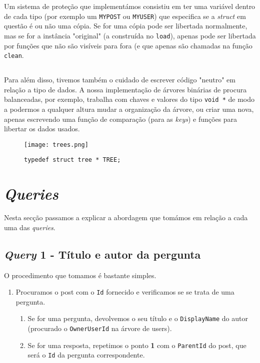 \documentclass[10pt]{article}
\begin{document}
		Um sistema de proteção que implementámos consistiu em ter uma variável dentro de 
	cada tipo (por exemplo um \texttt{MYPOST} ou \texttt{MYUSER}) que especifica se a
	\textit{struct} em questão é ou não uma cópia. Se for uma cópia pode ser libertada
	normalmente, mas se for a instância "original" (a construída no \texttt{load}), apenas 
	pode ser libertada por funções que não são visíveis para fora (e que apenas são chamadas na
	função \texttt{clean}.
	
	
	\subsection*{}
		Para além disso, tivemos também o cuidado de escrever código "neutro" em 
	relação a tipo de dados. A nossa implementação de árvores binárias de procura 
	balanceadas, por exemplo, trabalha com chaves e valores do tipo \texttt{void *}
	de modo a podermos a qualquer altura mudar a organização da árvore, ou criar uma
	nova, apenas escrevendo uma função de comparação (para as \textit{keys}) e funções
	para libertar os dados usados.

\begin{figure}[h]
\centering
		\begin{minipage}{.5\textwidth}\centering
		\texttt{[image: trees.png]}
		\caption{\texttt{typedef struct tree * TREE;}}
		\label{fig10:tree}
	\end{minipage}
\end{figure}
\pagebreak

\section{\textit{Queries}}
		Nesta secção passamos a explicar a abordagem que tomámos em relação
	a cada uma das \textit{queries}. 
	\subsection*{\textit{Query} 1 - Título e autor da pergunta}
		O procedimento que tomamos é bastante simples. 
		\begin{enumerate}
		\item Procuramos o post com o \texttt{Id} fornecido e verificamos se se trata
		 de uma pergunta. 
		\begin{enumerate}
		\item Se for uma pergunta, devolvemos o seu título e o \texttt{DisplayName} do autor 
	(procurado o \texttt{OwnerUserId} na árvore de users).
	
		\item Se for uma resposta, repetimos o ponto \textbf{1} com o \texttt{ParentId}
		do post, que será o \texttt{Id} da pergunta correspondente.
		\end{enumerate}
		\end{enumerate}
\end{document}
